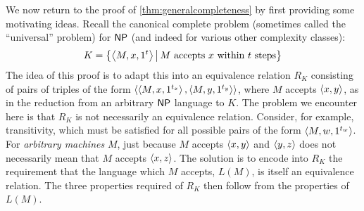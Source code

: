 We now return to the proof of \autoref{thm:generalcompleteness} by first providing some motivating ideas.
Recall the canonical complete problem (sometimes called the ``universal'' problem) for ${\mathsf{NP}}$ (and indeed for various other complexity classes):
\begin{displaymath}
  K = \left\{\left\langle M,x,1^t\right\rangle \,\middle|\, M\text{ accepts } x \text{ within } t \textnormal{ steps}\right\}
\end{displaymath}
The idea of this proof is to adapt this into an equivalence relation $R_K$ consisting of pairs of triples of the form $\left\langle\left\langle M,x,1^{t_x}\right\rangle,\left\langle M,y,1^{t_y}\right\rangle\right\rangle$, where $M$ accepts $\left\langle x,y\right\rangle$, as in the reduction from an arbitrary ${\mathsf{NP}}$ language to $K$.
The problem we encounter here is that $R_K$ is not necessarily an equivalence relation.
Consider, for example, transitivity, which must be satisfied for all possible pairs of the form $\left\langle M,w,1^{t_w}\right\rangle$.
For \emph{arbitrary machines} $M$, just because $M$ accepts $\left\langle x,y\right\rangle$ and $\left\langle y,z\right\rangle$ does not necessarily mean that $M$ accepts $\left\langle x,z\right\rangle$.
The solution is to encode into $R_K$ the requirement that the language which $M$ accepts, $L(M)$, is itself an equivalence relation.
The three properties required of $R_K$ then follow from the properties of $L(M)$.
%
%
